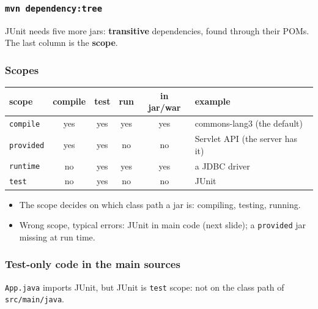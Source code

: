 \documentclass[aspectratio=169,10pt,compress]{beamer}
\begin{document}
\begin{frame}[t,fragile] \frametitle{\texttt{mvn dependency:tree}}

  \vspace{0.1em}
  \small
  JUnit needs five more jars: \textbf{transitive} dependencies, found through their POMs. The last column is the \textbf{scope}.
\end{frame}





\begin{frame}[t,fragile] \frametitle{Scopes}
  \begin{center}\small
  \begin{tabular}{@{}lccccL{0.34\textwidth}@{}}
    \toprule
    \textbf{scope}      & \textbf{compile} & \textbf{test} & \textbf{run} & \textbf{in jar/war} & \textbf{example} \\
    \midrule
    \texttt{compile}    & yes & yes & yes & yes & commons-lang3 (the default) \\
    \texttt{provided}   & yes & yes & no  & no  & Servlet API (the server has it) \\
    \texttt{runtime}    & no  & yes & yes & yes & a JDBC driver \\
    \texttt{test}       & no  & yes & no  & no  & JUnit \\
    \bottomrule
  \end{tabular}
  \end{center}
  \begin{itemize}\small
    \item The scope decides on which class path a jar is: compiling, testing, running.
    \item Wrong scope, typical errors: JUnit in main code (next slide); a \texttt{provided} jar missing at run time.
  \end{itemize}
\end{frame}




\begin{frame}[t,fragile] \frametitle{Test-only code in the main sources}

  \vspace{0.1em}
  \small
  \texttt{App.java} imports JUnit, but JUnit is \texttt{test} scope: not on the class path of \texttt{src/main/java}.
\end{frame}
\end{document}
